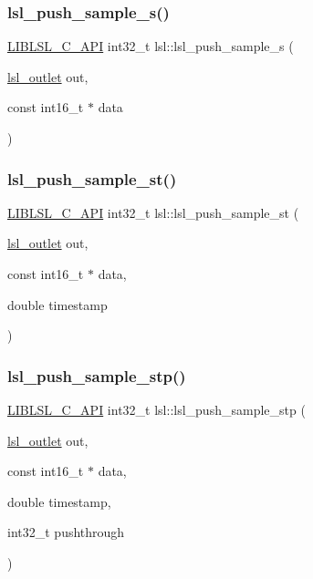 \subsubsection{\texorpdfstring{lsl\+\_\+push\+\_\+sample\+\_\+s()}{lsl\_push\_sample\_s()}}
{\footnotesize\ttfamily \hyperlink{lsl__cpp_8h_aafd0ef1813e8be84a1420c4f1df64615}{L\+I\+B\+L\+S\+L\+\_\+\+C\+\_\+\+A\+PI} int32\+\_\+t lsl\+::lsl\+\_\+push\+\_\+sample\+\_\+s (\begin{DoxyParamCaption}\item[{\hyperlink{namespacelsl_abcf512b0f66dacf86c10b165995fd50b}{lsl\+\_\+outlet}}]{out,  }\item[{const int16\+\_\+t $\ast$}]{data }\end{DoxyParamCaption})}

\mbox{\label{namespacelsl_a9a22e090bfa2e61ec19d70dc9bb5908d}} 
\subsubsection{\texorpdfstring{lsl\+\_\+push\+\_\+sample\+\_\+st()}{lsl\_push\_sample\_st()}}
{\footnotesize\ttfamily \hyperlink{lsl__cpp_8h_aafd0ef1813e8be84a1420c4f1df64615}{L\+I\+B\+L\+S\+L\+\_\+\+C\+\_\+\+A\+PI} int32\+\_\+t lsl\+::lsl\+\_\+push\+\_\+sample\+\_\+st (\begin{DoxyParamCaption}\item[{\hyperlink{namespacelsl_abcf512b0f66dacf86c10b165995fd50b}{lsl\+\_\+outlet}}]{out,  }\item[{const int16\+\_\+t $\ast$}]{data,  }\item[{double}]{timestamp }\end{DoxyParamCaption})}

\mbox{\label{namespacelsl_a916ebe3afa6e7b83d670211c7320df51}} 
\subsubsection{\texorpdfstring{lsl\+\_\+push\+\_\+sample\+\_\+stp()}{lsl\_push\_sample\_stp()}}
{\footnotesize\ttfamily \hyperlink{lsl__cpp_8h_aafd0ef1813e8be84a1420c4f1df64615}{L\+I\+B\+L\+S\+L\+\_\+\+C\+\_\+\+A\+PI} int32\+\_\+t lsl\+::lsl\+\_\+push\+\_\+sample\+\_\+stp (\begin{DoxyParamCaption}\item[{\hyperlink{namespacelsl_abcf512b0f66dacf86c10b165995fd50b}{lsl\+\_\+outlet}}]{out,  }\item[{const int16\+\_\+t $\ast$}]{data,  }\item[{double}]{timestamp,  }\item[{int32\+\_\+t}]{pushthrough }\end{DoxyParamCaption})}

